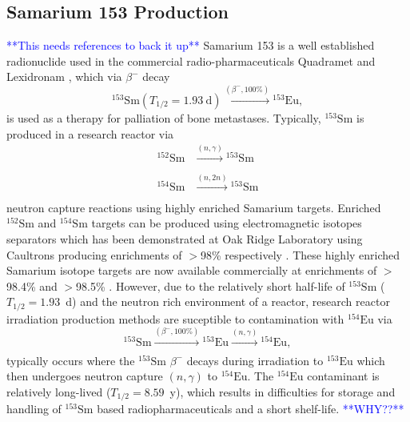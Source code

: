 \documentclass[../main.tex]{subfiles}
\begin{document}
\subsection{Samarium 153 Production}
\textcolor{blue}{**This needs references to back it up**}
Samarium 153 is a well established radionuclide used in the commercial radio-pharmaceuticals Quadramet \cite{} and Lexidronam \cite{}, which via $\beta^{-}$ decay 
\begin{equation}
^{153}\mathrm{Sm} \left(T_{1/2} = 1.93~\mathrm{\si{\day}}\right)\xrightarrow[]{\left(\beta^{-},\mathrm{100\%}\right)} {}^{153}\mathrm{Eu},
\label{eq:153Sm_beta_minus_decay}    
\end{equation}
is used as a therapy for palliation of bone metastases. Typically, $^{153}\mathrm{Sm}$ is produced in a research reactor via 
\begin{align}
^{152}\mathrm{Sm}&\xrightarrow[]{\left(n,\gamma\right)}{}^{153}\mathrm{Sm} \\
^{154}\mathrm{Sm}&\xrightarrow[]{\left(n,2n\right)}{}^{153}\mathrm{Sm}
\label{eq:153Sm_research_reactor_production}
\end{align}
neutron capture reactions using highly enriched Samarium targets. Enriched $^{152}\mathrm{Sm}$ and $^{154}\mathrm{Sm}$ targets can be produced using electromagnetic isotopes separators which has been demonstrated at Oak Ridge Laboratory using Caultrons producing enrichments of $>$98\% respectively \cite{bell1987stable}. These highly enriched Samarium isotope targets are now available commercially at enrichments of $>$98.4\% and $>$98.5\% \cite{isoflex2021sm}. However, due to the relatively short half-life of $^{153}\mathrm{Sm}$ ($T_{1/2} = 1.93$~\si{\day}) and the neutron rich environment of a reactor, research reactor irradiation production methods are suceptible to contamination with $^{154}\mathrm{Eu}$ via
\begin{equation}
^{153}\mathrm{Sm}\xrightarrow[]{\left(\beta^{-},\mathrm{100\%}\right)}{}^{153}\mathrm{Eu}\xrightarrow[]{\left(n,\gamma\right)}{}^{154}\mathrm{Eu},
\label{eq:153Sm_reactor_contamination}    
\end{equation}
typically occurs where the $^{153}\mathrm{Sm}$ $\beta^{-}$ decays during irradiation to $^{153}\mathrm{Eu}$ which then undergoes neutron capture $\left(n,\gamma\right)$ to $^{154}\mathrm{Eu}$. The $^{154}\mathrm{Eu}$ contaminant is relatively long-lived ($T_{1/2} = 8.59$~y), which results in difficulties for storage and handling of $^{153}\mathrm{Sm}$ based radiopharmaceuticals and a short shelf-life. \textcolor{blue}{**WHY??**}
\end{document}
